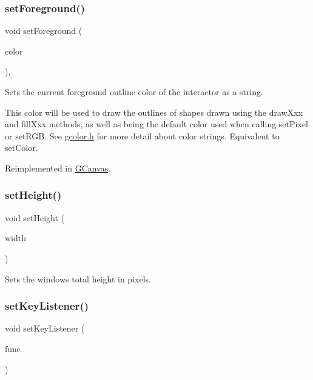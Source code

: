 \subsubsection{\texorpdfstring{set\+Foreground()}{setForeground()}\hspace{0.1cm}{\footnotesize\ttfamily [2/2]}}
{\footnotesize\ttfamily void set\+Foreground (\begin{DoxyParamCaption}\item[{const std\+::string \&}]{color }\end{DoxyParamCaption})\hspace{0.3cm}{\ttfamily [virtual]}, {\ttfamily [inherited]}}



Sets the current foreground outline color of the interactor as a string. 

This color will be used to draw the outlines of shapes drawn using the draw\+Xxx and fill\+Xxx methods, as well as being the default color used when calling set\+Pixel or set\+R\+GB. See \mbox{\hyperlink{gcolor_8h_source}{gcolor.\+h}} for more detail about color strings. Equivalent to set\+Color. 

Reimplemented in \mbox{\hyperlink{classGCanvas_a088e04dfc56273df4cedab2b11b970f5}{G\+Canvas}}.

\mbox{\label{classGWindow_a4b812426e19cdd9f6d62e7b5d90e6bec}} 
\subsubsection{\texorpdfstring{set\+Height()}{setHeight()}}
{\footnotesize\ttfamily void set\+Height (\begin{DoxyParamCaption}\item[{double}]{width }\end{DoxyParamCaption})\hspace{0.3cm}{\ttfamily [virtual]}}



Sets the window\textquotesingle{}s total height in pixels. 

\mbox{\label{classGWindow_aeb8324d3287fa1fbe093f4d6230cf0a6}} 
\subsubsection{\texorpdfstring{set\+Key\+Listener()}{setKeyListener()}\hspace{0.1cm}{\footnotesize\ttfamily [1/2]}}
{\footnotesize\ttfamily void set\+Key\+Listener (\begin{DoxyParamCaption}\item[{G\+Event\+Listener}]{func }\end{DoxyParamCaption})\hspace{0.3cm}{\ttfamily [virtual]}}

